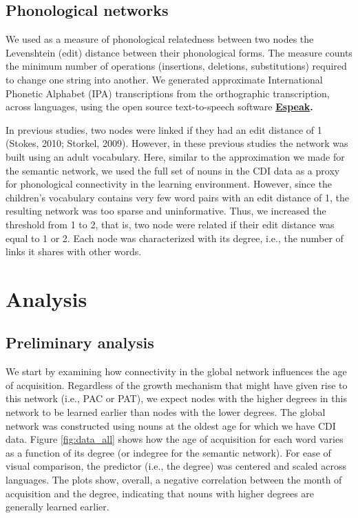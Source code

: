 \documentclass[10pt, letterpaper]{article}
\begin{document}
\subsection{Phonological networks}\label{phonological-networks}

We used as a measure of phonological relatedness between two nodes the
Levenshtein (edit) distance between their phonological forms. The
measure counts the minimum number of operations (insertions, deletions,
substitutions) required to change one string into another. We generated
approximate International Phonetic Alphabet (IPA) transcriptions from
the orthographic transcription, across languages, using the open source
text-to-speech software
\textbf{\href{http://http://espeak.sourceforge.net/}{Espeak}.}

In previous studies, two nodes were linked if they had an edit distance
of 1 (Stokes, 2010; Storkel, 2009). However, in these previous studies
the network was built using an adult vocabulary. Here, similar to the
approximation we made for the semantic network, we used the full set of
nouns in the CDI data as a proxy for phonological connectivity in the
learning environment. However, since the children's vocabulary contains
very few word pairs with an edit distance of 1, the resulting network
was too sparse and uninformative. Thus, we increased the threshold from
1 to 2, that is, two node were related if their edit distance was equal
to 1 or 2. Each node was characterized with its degree, i.e., the number
of links it shares with other words.

\section{Analysis}\label{analysis}

\subsection{Preliminary analysis}\label{preliminary-analysis}

We start by examining how connectivity in the global network influences
the age of acquisition. Regardless of the growth mechanism that might
have given rise to this network (i.e., PAC or PAT), we expect nodes with
the higher degrees in this network to be learned earlier than nodes with
the lower degrees. The global network was constructed using nouns at the
oldest age for which we have CDI data. Figure \ref{fig:data_all} shows
how the age of acquisition for each word varies as a function of its
degree (or indegree for the semantic network). For ease of visual
comparison, the predictor (i.e., the degree) was centered and scaled
across languages. The plots show, overall, a negative correlation
between the month of acquisition and the degree, indicating that nouns
with higher degrees are generally learned earlier.
\end{document}
